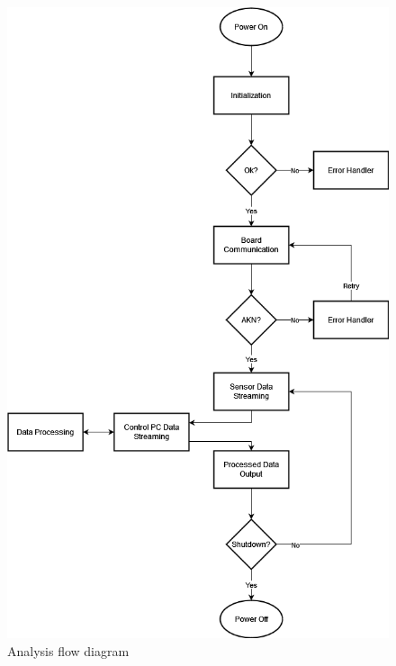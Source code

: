 \begin{figure}[!ht]
\end{figure}

\begin{figure}[!ht]
    \caption{Analysis flow diagram}\label{fig:analysis}
    \centering
    \includegraphics[scale=0.40]{project_plan/figures/Analysis_Flow_Diagram}
\end{figure}

